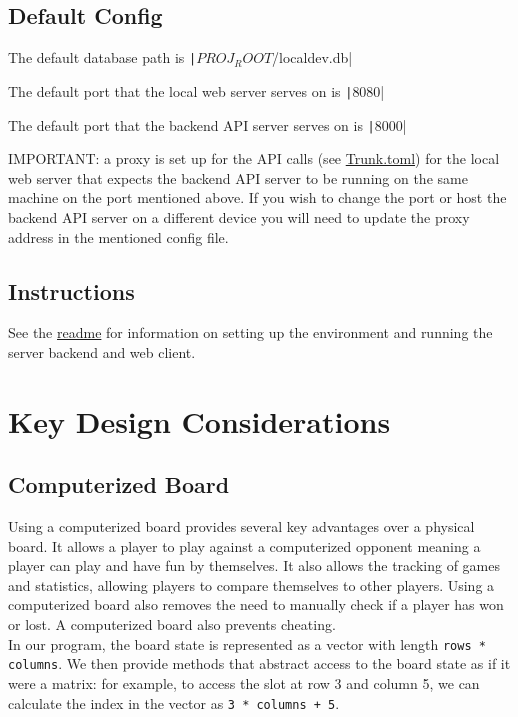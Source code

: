 \documentclass{article}
\begin{document}
\subsection{Default Config}

The default database path is \texttt|$PROJ_ROOT$/localdev.db|

The default port that the local web server serves on is \texttt|8080|

The default port that the backend API server serves on is \texttt|8000|

IMPORTANT: a proxy is set up for the API calls (see \href{run: ../Trunk.toml}{Trunk.toml}) for the local web server that expects the backend API server to be running on the same machine on the port mentioned above.
If you wish to change the port or host the backend API server on a different device you will need to update the proxy address in the mentioned config file.

\subsection{Instructions}

See the \href{run:../README.md}{readme} for information on setting up the environment and running the server backend and web client.

\section{Key Design Considerations}

\subsection{Computerized Board}
Using a computerized board provides several key advantages over a physical board. It allows a player to play against a computerized opponent meaning a player can play and have fun by themselves. It also allows the tracking of games and statistics, allowing players to compare themselves to other players. Using a computerized board also removes the need to manually check if a player has won or lost. A computerized board also prevents cheating. \\

In our program, the board state is represented as a vector with length \texttt{rows * columns}. We then provide methods that abstract access to the board state as if it were a matrix: for example, to access the slot at row 3 and column 5, we can calculate the index in the vector as \texttt{3 * columns + 5}.
\end{document}
